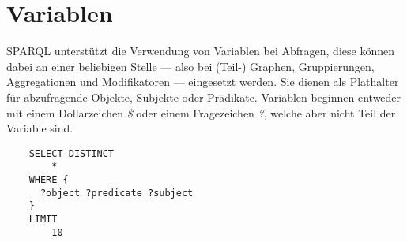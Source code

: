 \section{Variablen}
\label{sec:sparql_variablen}

SPARQL unterstützt die Verwendung von Variablen bei Abfragen, diese können dabei an einer beliebigen Stelle --- also bei (Teil-) Graphen, Gruppierungen, Aggregationen und Modifikatoren --- eingesetzt werden.
Sie dienen als Plathalter für abzufragende Objekte, Subjekte oder Prädikate. Variablen beginnen entweder mit einem Dollarzeichen \textit{\$} oder einem Fragezeichen \textit{?}, welche aber nicht Teil der Variable sind.

\begin{lstlisting}
    SELECT DISTINCT
        *
    WHERE {
      ?object ?predicate ?subject
    }
    LIMIT
        10
\end{lstlisting}

